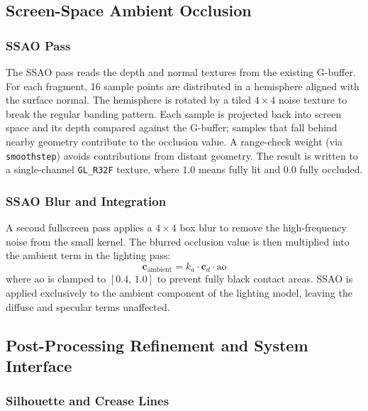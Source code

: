 \documentclass[12pt, a4paper]{article}
\begin{document}
\subsection{Screen-Space Ambient Occlusion}
\label{sec:ssao}

\subsubsection{SSAO Pass}

The SSAO pass reads the depth and normal textures from the existing G-buffer. For each fragment, 16 sample points are distributed in a hemisphere aligned with the surface normal. The hemisphere is rotated by a tiled $4\times4$ noise texture to break the regular banding pattern. Each sample is projected back into screen space and its depth compared against the G-buffer; samples that fall behind nearby geometry contribute to the occlusion value. A range-check weight (via \texttt{smoothstep}) avoids contributions from distant geometry. The result is written to a single-channel \texttt{GL\_R32F} texture, where $1.0$ means fully lit and $0.0$ fully occluded.

\subsubsection{SSAO Blur and Integration}

A second fullscreen pass applies a $4\times4$ box blur to remove the high-frequency noise from the small kernel. The blurred occlusion value is then multiplied into the ambient term in the lighting pass:
\begin{equation}
    \mathbf{c}_{\text{ambient}} = k_a \cdot \mathbf{c}_d \cdot \mathrm{ao}
    \label{eq:ssao}
\end{equation}
where $\mathrm{ao}$ is clamped to $[0.4,\,1.0]$ to prevent fully black contact areas. SSAO is applied exclusively to the ambient component of the lighting model, leaving the diffuse and specular terms unaffected.

\subsection{Post-Processing Refinement and System Interface}

\subsubsection{Silhouette and Crease Lines}
\label{sec:silhouette}
\end{document}
